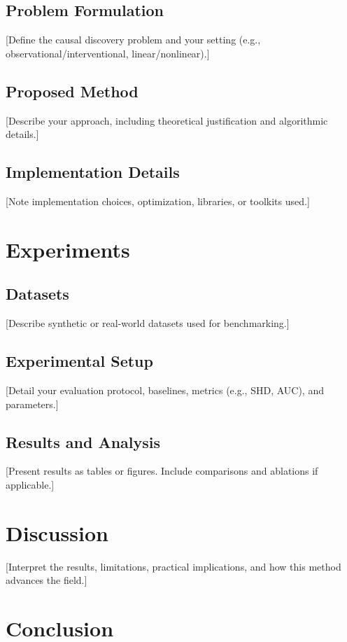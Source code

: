 \documentclass[a4paper]{article}
\begin{document}
\subsection{Problem Formulation}
[Define the causal discovery problem and your setting (e.g., observational/interventional, linear/nonlinear).]

\subsection{Proposed Method}
[Describe your approach, including theoretical justification and algorithmic details.]

\subsection{Implementation Details}
[Note implementation choices, optimization, libraries, or toolkits used.]

\section{Experiments}
\label{sec:experiments}

\subsection{Datasets}
[Describe synthetic or real-world datasets used for benchmarking.]

\subsection{Experimental Setup}
[Detail your evaluation protocol, baselines, metrics (e.g., SHD, AUC), and parameters.]

\subsection{Results and Analysis}
[Present results as tables or figures. Include comparisons and ablations if applicable.]

\section{Discussion}
\label{sec:discussion}

[Interpret the results, limitations, practical implications, and how this method advances the field.]

\section{Conclusion}
\label{sec:conclusion}
\end{document}
